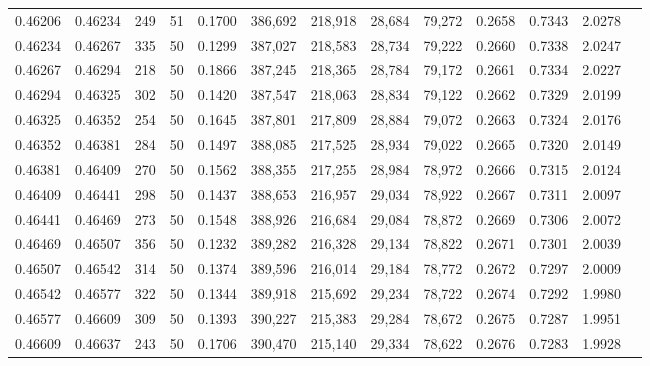 \begin{tabular}{rrrrrrrrrrrrr}
0.46206 & 0.46234 &   249 &  51 &                                     0.1700 & 386,692 & 218,918 &  28,684 &  79,272 & 0.2658 & 0.7343 & 2.0278 \\
0.46234 & 0.46267 &   335 &  50 &                                     0.1299 & 387,027 & 218,583 &  28,734 &  79,222 & 0.2660 & 0.7338 & 2.0247 \\
0.46267 & 0.46294 &   218 &  50 &                                     0.1866 & 387,245 & 218,365 &  28,784 &  79,172 & 0.2661 & 0.7334 & 2.0227 \\
0.46294 & 0.46325 &   302 &  50 &                                     0.1420 & 387,547 & 218,063 &  28,834 &  79,122 & 0.2662 & 0.7329 & 2.0199 \\
0.46325 & 0.46352 &   254 &  50 &                                     0.1645 & 387,801 & 217,809 &  28,884 &  79,072 & 0.2663 & 0.7324 & 2.0176 \\
0.46352 & 0.46381 &   284 &  50 &                                     0.1497 & 388,085 & 217,525 &  28,934 &  79,022 & 0.2665 & 0.7320 & 2.0149 \\
0.46381 & 0.46409 &   270 &  50 &                                     0.1562 & 388,355 & 217,255 &  28,984 &  78,972 & 0.2666 & 0.7315 & 2.0124 \\
0.46409 & 0.46441 &   298 &  50 &                                     0.1437 & 388,653 & 216,957 &  29,034 &  78,922 & 0.2667 & 0.7311 & 2.0097 \\
0.46441 & 0.46469 &   273 &  50 &                                     0.1548 & 388,926 & 216,684 &  29,084 &  78,872 & 0.2669 & 0.7306 & 2.0072 \\
0.46469 & 0.46507 &   356 &  50 &                                     0.1232 & 389,282 & 216,328 &  29,134 &  78,822 & 0.2671 & 0.7301 & 2.0039 \\
0.46507 & 0.46542 &   314 &  50 &                                     0.1374 & 389,596 & 216,014 &  29,184 &  78,772 & 0.2672 & 0.7297 & 2.0009 \\
0.46542 & 0.46577 &   322 &  50 &                                     0.1344 & 389,918 & 215,692 &  29,234 &  78,722 & 0.2674 & 0.7292 & 1.9980 \\
0.46577 & 0.46609 &   309 &  50 &                                     0.1393 & 390,227 & 215,383 &  29,284 &  78,672 & 0.2675 & 0.7287 & 1.9951 \\
0.46609 & 0.46637 &   243 &  50 &                                     0.1706 & 390,470 & 215,140 &  29,334 &  78,622 & 0.2676 & 0.7283 & 1.9928 \\

\end{tabular}
